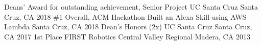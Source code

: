 \begin{cvhonors}
	\cvhonor
	{Deans' Award for outstanding achievement, Senior Project}
	{UC Santa Cruz}
	{Santa Cruz, CA}
	{2018}
	\cvhonor
	{\#1 Overall, ACM Hackathon}
	{Built an Alexa Skill using AWS Lambda}
	{Santa Cruz, CA}
	{2018}
	\cvhonor
	{Dean's Honors (2x)}
	{UC Santa Cruz}
	{Santa Cruz, CA}
	{2017}
	\cvhonor
	{1st Place}
	{FIRST Robotics Central Valley Regional}
	{Madera, CA}
	{2013}
\end{cvhonors}